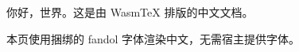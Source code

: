 \documentclass[11pt]{ctexart}
\begin{document}
你好，世界。这是由 WasmTeX 排版的中文文档。

本页使用捆绑的 fandol 字体渲染中文，无需宿主提供字体。
\end{document}
